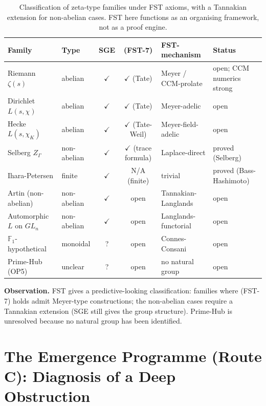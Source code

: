 \documentclass[11pt,a4paper]{article}
\theoremstyle{plain}
\theoremstyle{definition}
\newcommand{\F}{\mathbb{F}}
\newcommand{\chifn}{\chi}
\begin{document}
\begin{table}[h]
\centering
\footnotesize
\begin{tabular}{@{}L{0.16\textwidth}L{0.14\textwidth}ccL{0.22\textwidth}L{0.20\textwidth}@{}}
\toprule
\textbf{Family} & \textbf{Type} & \textbf{SGE} & \textbf{(FST-7)} & \textbf{FST-mechanism} & \textbf{Status} \\
\midrule
Riemann $\zeta(s)$ & abelian & $\checkmark$ & $\checkmark$ (Tate) & Meyer / CCM-prolate & open; CCM numerics strong \\
Dirichlet $L(s, \chifn)$ & abelian & $\checkmark$ & $\checkmark$ (Tate) & Meyer-adelic & open \\
Hecke $L(s, \chifn_K)$ & abelian & $\checkmark$ & $\checkmark$ (Tate-Weil) & Meyer-field-adelic & open \\
Selberg $Z_\Gamma$ & non-abelian & $\checkmark$ & $\checkmark$ (trace formula) & Laplace-direct & proved (Selberg) \\
Ihara-Petersen & finite & $\checkmark$ & N/A (finite) & trivial & proved (Bass-Hashimoto) \\
Artin (non-abelian) & non-abelian & $\checkmark$ & open & Tannakian-Langlands & open \\
Automorphic $L$ on $GL_n$ & non-abelian & $\checkmark$ & open & Langlands-functorial & open \\
$\F_1$-hypothetical & monoidal & ? & open & Connes-Consani & open \\
Prime-Hub (OP5) & unclear & ? & open & no natural group & open \\
\bottomrule
\end{tabular}
\caption{Classification of zeta-type families under FST axioms,
with a Tannakian extension for non-abelian cases.  FST here functions
as an organising framework, not as a proof engine.}
\label{tab:classification-v2}
\end{table}

\textbf{Observation.}  FST gives a predictive-looking classification:
families where (FST-7) holds admit Meyer-type constructions; the
non-abelian cases require a Tannakian extension (SGE still gives
the group structure).  Prime-Hub is unresolved because no natural
group has been identified.

\section{The Emergence Programme (Route C): Diagnosis of a Deep Obstruction}
\label{sec:emergence}
\end{document}
